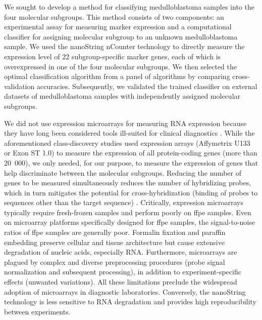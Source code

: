 We sought to develop a method for classifying medulloblastoma samples into the four molecular subgroups. This method consists of two components: an experimental assay for measuring marker expression and a computational classifier for assigning molecular subgroup to an unknown medulloblastoma sample. We used the nanoString nCounter technology  to directly measure the expression level of 22 subgroup-specific marker genes, each of which is overexpressed in one of the four molecular subgroups. We then selected the optimal classification algorithm from a panel of algorithms by comparing cross-validation accuracies. Subsequently, we validated the trained classifier on external datasets of medulloblastoma samples with independently assigned molecular subgroups.

We did not use expression microarrays for measuring RNA expression because they have long been considered tools ill-suited for clinical diagnostics . While the aforementioned class-discovery studies used expression arrays (Affymetrix U133 or Exon ST 1.0) to measure the expression of all protein-coding genes (more than 20~000), we only needed, for our purpose, to measure the expression of genes that help discriminate between the molecular subgroups.  Reducing the number of genes to be measured simultaneously reduces the number of hybridizing probes, which in turn mitigates the potential for cross-hybridization (binding of probes to sequences other than the target sequence) . Critically, expression microarrays typically require fresh-frozen samples and perform poorly on \gls{ffpe} samples. Even on microarray platforms specifically designed for \gls{ffpe} samples, the signal-to-noise ratios of \gls{ffpe} samples are generally poor. Formalin fixation and paraffin embedding preserve cellular and tissue architecture but cause extensive degradation of nucleic acids, especially RNA. Furthermore, microarrays are plagued by complex and diverse preprocessing procedures (probe signal normalization and subsequent processing), in addition to experiment-specific effects (unwanted variations). All these limitations preclude the widespread adoption of microarrays in diagnostic laboratories. Conversely, the nanoString technology is less sensitive to RNA degradation and provides high reproducibility between experiments.

